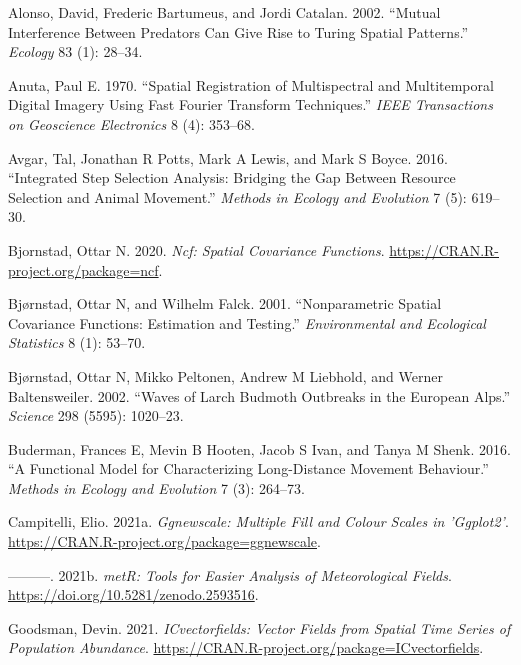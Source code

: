 \hypertarget{refs}{}
\begin{CSLReferences}{1}{0}
\leavevmode{}%
Alonso, David, Frederic Bartumeus, and Jordi Catalan. 2002. {``Mutual Interference Between Predators Can Give Rise to Turing Spatial Patterns.''} \emph{Ecology} 83 (1): 28--34.

\leavevmode{}%
Anuta, Paul E. 1970. {``Spatial Registration of Multispectral and Multitemporal Digital Imagery Using Fast Fourier Transform Techniques.''} \emph{IEEE Transactions on Geoscience Electronics} 8 (4): 353--68.

\leavevmode{}%
Avgar, Tal, Jonathan R Potts, Mark A Lewis, and Mark S Boyce. 2016. {``Integrated Step Selection Analysis: Bridging the Gap Between Resource Selection and Animal Movement.''} \emph{Methods in Ecology and Evolution} 7 (5): 619--30.

\leavevmode{}%
Bjornstad, Ottar N. 2020. \emph{Ncf: Spatial Covariance Functions}. \url{https://CRAN.R-project.org/package=ncf}.

\leavevmode{}%
Bjørnstad, Ottar N, and Wilhelm Falck. 2001. {``Nonparametric Spatial Covariance Functions: Estimation and Testing.''} \emph{Environmental and Ecological Statistics} 8 (1): 53--70.

\leavevmode{}%
Bjørnstad, Ottar N, Mikko Peltonen, Andrew M Liebhold, and Werner Baltensweiler. 2002. {``Waves of Larch Budmoth Outbreaks in the European Alps.''} \emph{Science} 298 (5595): 1020--23.

\leavevmode{}%
Buderman, Frances E, Mevin B Hooten, Jacob S Ivan, and Tanya M Shenk. 2016. {``A Functional Model for Characterizing Long-Distance Movement Behaviour.''} \emph{Methods in Ecology and Evolution} 7 (3): 264--73.

\leavevmode{}%
Campitelli, Elio. 2021a. \emph{Ggnewscale: Multiple Fill and Colour Scales in 'Ggplot2'}. \url{https://CRAN.R-project.org/package=ggnewscale}.

\leavevmode{}%
---------. 2021b. \emph{metR: Tools for Easier Analysis of Meteorological Fields}. \url{https://doi.org/10.5281/zenodo.2593516}.

\leavevmode{}%
Goodsman, Devin. 2021. \emph{ICvectorfields: Vector Fields from Spatial Time Series of Population Abundance}. \url{https://CRAN.R-project.org/package=ICvectorfields}.


\end{CSLReferences}
